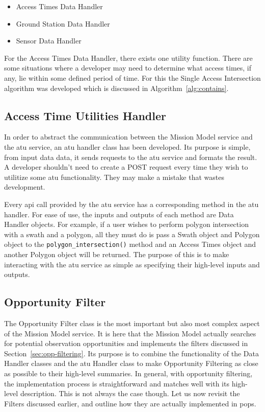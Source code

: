 \begin{itemize} 
    
    \item Access Times Data Handler
    \item Ground Station Data Handler
    \item Sensor Data Handler

\end{itemize}

For the Access Times Data Handler, there exists one utility function. There are
some situations where a developer may need to determine what access times, if
any, lie within some defined period of time. For this the Single Access
Intersection algorithm was developed which is discussed in
Algorithm~\ref{alg:contains}.


\subsection{Access Time Utilities Handler}

In order to abstract the communication between the Mission Model service and
the \gls{atu} service, an \gls{atu} handler class has been developed. Its
purpose is simple, from input data data, it sends requests to the \gls{atu}
service and formats the result. A developer shouldn't need to create a POST
request every time they wish to utilitize some \gls{atu} functionality. They
may make a mistake that wastes development. 

Every \gls{api} call provided by the \gls{atu} service has a corresponding
method in the \gls{atu} handler. For ease of use, the inputs and outputs of
each method are Data Handler objects. For example, if a user wishes to perform
polygon intersection with a swath and a polygon, all they must do is pass a
Swath object and Polygon object to the \texttt{polygon\_intersection()} method
and an Access Times object and another Polygon object will be returned. The
purpose of this is to make interacting with the \gls{atu} service as simple as
specifying their high-level inputs and outputs.


\subsection{Opportunity Filter}

The Opportunity Filter class is the most important but also most complex aspect
of the Mission Model service. It is here that the Mission Model actually
searches for potential observation opportunities and implements the filters
discussed in Section~\ref{sec:opp-filtering}. Its purpose is to combine
the functionality of the Data Handler classes and the \gls{atu} Handler class
to make Opportunity Filtering as close as possible to their high-level
summaries. In general, with opportunity filtering, the implementation process
is straightforward and matches well with its high-level description. This is
not always the case though. Let us now revisit the Filters discussed earlier,
and outline how they are actually implemented in \gls{pops}. 

